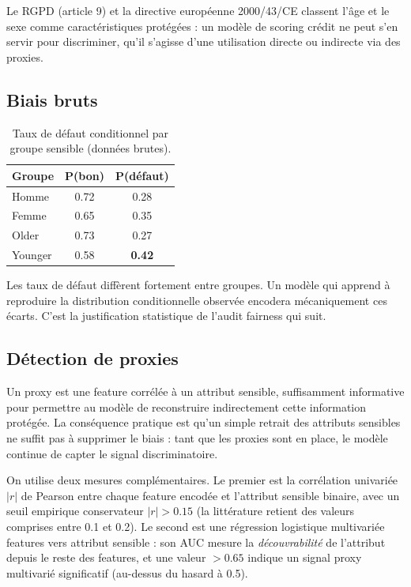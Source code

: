 \documentclass[11pt, a4paper]{article}
\begin{document}
Le RGPD (article 9) et la directive européenne 2000/43/CE classent l'âge et le sexe comme caractéristiques protégées : un modèle de scoring crédit ne peut s'en servir pour discriminer, qu'il s'agisse d'une utilisation directe ou indirecte via des proxies.

\subsection{Biais bruts}

\begin{table}[H]
\centering
\begin{tabular}{lcc}
\toprule
\textbf{Groupe} & \textbf{P(bon)} & \textbf{P(défaut)} \\
\midrule
Homme    & 0.72 & 0.28 \\
Femme    & 0.65 & 0.35 \\
\midrule
Older    & 0.73 & 0.27 \\
Younger  & 0.58 & \textbf{0.42} \\
\bottomrule
\end{tabular}
\caption{Taux de défaut conditionnel par groupe sensible (données brutes).}
\end{table}

Les taux de défaut diffèrent fortement entre groupes. Un modèle qui apprend à reproduire la distribution conditionnelle observée encodera mécaniquement ces écarts. C'est la justification statistique de l'audit fairness qui suit.

\subsection{Détection de proxies}
\label{sec:proxies-early}

Un proxy est une feature corrélée à un attribut sensible, suffisamment informative pour permettre au modèle de reconstruire indirectement cette information protégée. La conséquence pratique est qu'un simple retrait des attributs sensibles ne suffit pas à supprimer le biais : tant que les proxies sont en place, le modèle continue de capter le signal discriminatoire.

On utilise deux mesures complémentaires. Le premier est la corrélation univariée $|r|$ de Pearson entre chaque feature encodée et l'attribut sensible binaire, avec un seuil empirique conservateur $|r| > 0.15$ (la littérature retient des valeurs comprises entre 0.1 et 0.2). Le second est une régression logistique multivariée features vers attribut sensible : son AUC mesure la \emph{découvrabilité} de l'attribut depuis le reste des features, et une valeur $> 0.65$ indique un signal proxy multivarié significatif (au-dessus du hasard à 0.5).
\end{document}
